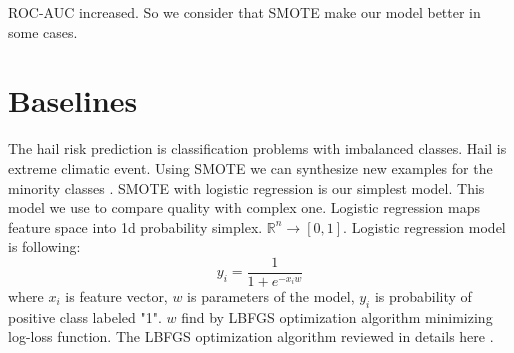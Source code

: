 \documentclass{article}
\begin{document}
\begin{figure}[h]
\begin{minipage}[h]{0.49\linewidth}
\end{minipage}
\hfill
\begin{minipage}[h]{0.49\linewidth}
\end{minipage}
\end{figure}

ROC-AUC increased. So we consider that SMOTE make our model better in some cases.

\section{Baselines}
The hail risk prediction is classification problems with imbalanced classes. Hail is extreme climatic event. Using SMOTE we can synthesize new examples for the minority classes \cite{DBLP:journals/corr/abs-1106-1813}. SMOTE with logistic regression is our simplest model. This model we use to compare quality with complex one. Logistic regression maps feature space into 1d probability simplex. $\mathbb{R}^n \rightarrow [0,1]$. Logistic regression model is following:
\begin{equation}
    y_i = \frac{1}{1 + e^{-x_iw}}
\end{equation}
where $x_i$ is feature vector, $w$ is parameters of the model, $y_i$ is probability of positive class labeled "1". $w$ find by LBFGS optimization algorithm minimizing log-loss function. The LBFGS optimization algorithm reviewed in details here \cite{mokhtari2014global}.

    
\newpage



\end{document}
